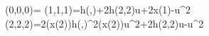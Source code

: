 \phi(0,0,0)=
\phi(1,1,1)=h\left(\alpha,\beta\right)+2\*h\left(2,2\right)\*u+2\*x\left(1\right)-u^2
\phi(2,2,2)=2\*\cos\left(x\left(2\right)\right)\*h\left(\alpha,\beta\right)^2\*\sin\left(x\left(2\right)\right)\*u^2+2\*h\left(2,2\right)\*u-u^2
